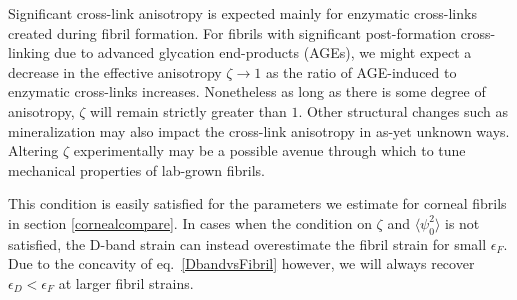 
Significant cross-link anisotropy is expected mainly for enzymatic cross-links created during fibril formation. For fibrils with significant post-formation cross-linking due to advanced glycation end-products (AGEs), we might expect a decrease in the effective anisotropy $\zeta\to1$ as the ratio of AGE-induced to enzymatic cross-links increases. Nonetheless as long as there is some degree of anisotropy, $\zeta$ will remain strictly greater than $1$. Other structural changes such as mineralization may also impact the cross-link anisotropy in as-yet unknown ways. Altering $\zeta$ experimentally may be a possible avenue through which to tune mechanical properties of lab-grown fibrils.





This condition is easily satisfied for the parameters we estimate for corneal fibrils in section \ref{cornealcompare}. In cases when the condition on $\zeta$ and $\langle\psi_0^2\rangle$ is not satisfied, the D-band strain can instead overestimate the fibril strain for small $\epsilon_F$. Due to the concavity of eq.~\ref{DbandvsFibril} however, we will always recover $\epsilon_D<\epsilon_F$ at larger fibril strains.

